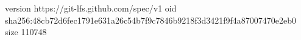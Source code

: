 version https://git-lfs.github.com/spec/v1
oid sha256:48cb72d6fec1791e631a26c54b7f9c7846b9218f3d3421f9f4a87007470e2eb0
size 110748

